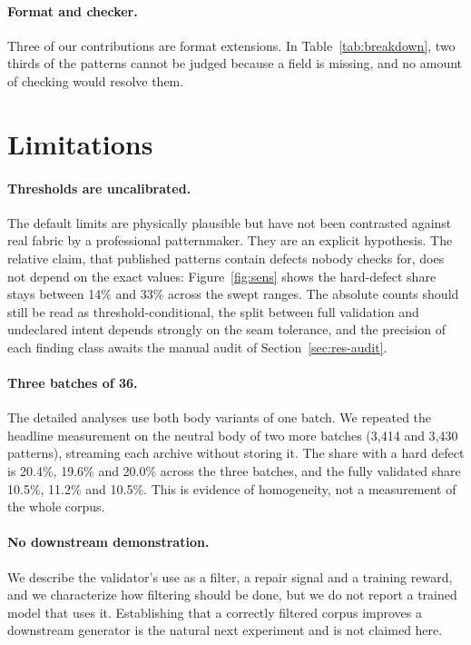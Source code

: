 \documentclass[10pt,twocolumn]{article}
\begin{document}
\paragraph{Format and checker.} Three of our contributions are format
extensions. In Table~\ref{tab:breakdown}, two thirds of the patterns cannot be
judged because a field is missing, and no amount of checking would resolve
them.

\section{Limitations}
\label{sec:limitations}

\paragraph{Thresholds are uncalibrated.} The default limits are physically
plausible but have not been contrasted against real fabric by a professional
patternmaker. They are an explicit hypothesis. The relative claim, that
published patterns contain defects nobody checks for, does not depend on the
exact values: Figure~\ref{fig:sens} shows the hard-defect share stays between
14\% and 33\% across the swept ranges. The absolute counts should still be read
as threshold-conditional, the split between full validation and undeclared
intent depends strongly on the seam tolerance, and the precision of each
finding class awaits the manual audit of Section~\ref{sec:res-audit}.

\paragraph{Three batches of 36.} The detailed analyses use both body variants
of one batch. We repeated the headline measurement on the neutral body of two
more batches (3{,}414 and 3{,}430 patterns), streaming each archive without
storing it. The share with a hard defect is 20.4\%, 19.6\% and 20.0\% across
the three batches, and the fully validated share 10.5\%, 11.2\% and 10.5\%.
This is evidence of homogeneity, not a measurement of the whole corpus.


\paragraph{No downstream demonstration.} We describe the validator's use as a
filter, a repair signal and a training reward, and we characterize how
filtering should be done, but we do not report a trained model that uses it.
Establishing that a correctly filtered corpus improves a downstream generator
is the natural next experiment and is not claimed here.
\end{document}
